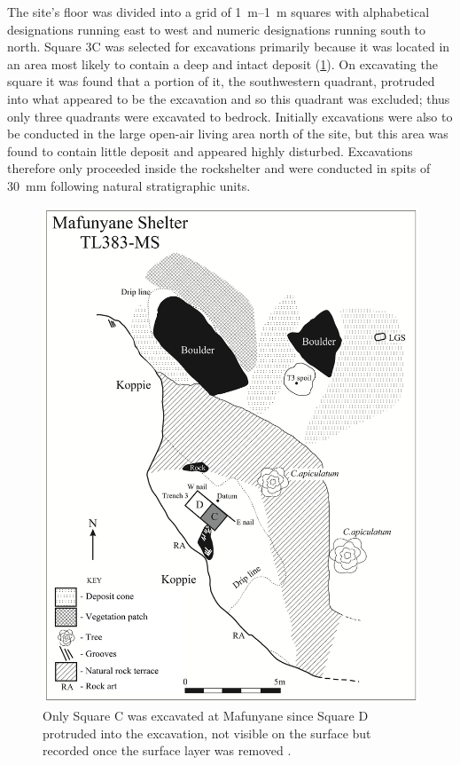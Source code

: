 \documentclass{ijsra}
\begin{document}
The site’s floor was  divided into a grid of \SIrange{1}{1}{\meter} squares with alphabetical designations running east to west and numeric designations running south to north. 
Square 3C was selected for excavations primarily because it was located in an area most likely to contain a deep and intact deposit (\cref{fig:Forssman-Figure02}). 
On excavating the square it was found that a portion of it, the southwestern quadrant, protruded into what appeared to be the \textcite{Walker_1994} excavation and so this quadrant was excluded; 
thus only three quadrants were excavated to bedrock. Initially excavations were also to be conducted in the large open-air living area north of the site, but this area was found to contain little deposit and appeared highly disturbed. 
Excavations therefore only proceeded inside the rockshelter and were conducted in spits of \SI{30}{\milli\meter} following natural stratigraphic units.

	\begin{figure}
		\includegraphics[width=\linewidth]{figures/Forssman-Figure02}
		\caption{Only Square C was excavated at Mafunyane since Square D protruded into the \textcite{Walker_1994} excavation, not visible on the surface but recorded once the surface layer was removed \parencite[from][96]{Forssman_2014a}.}
		\label{fig:Forssman-Figure02}
	\end{figure}
\end{document}
